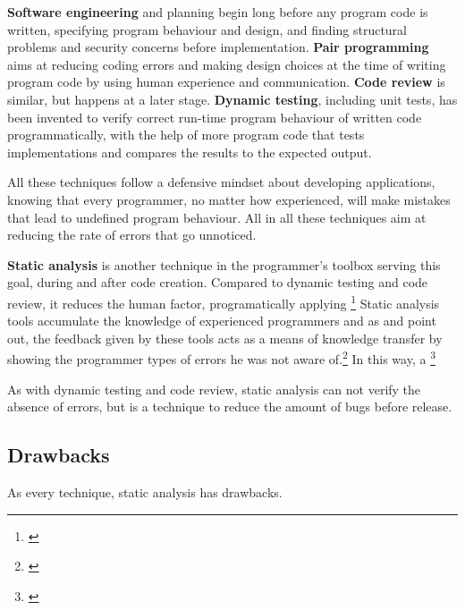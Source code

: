 \textbf{Software engineering} and planning begin long before any program code is written, specifying program behaviour and design, and finding structural problems and security concerns before implementation. \textbf{Pair programming} aims at reducing coding errors and making design choices at the time of writing program code by using human experience and communication. \textbf{Code review} is similar, but happens at a later stage. \textbf{Dynamic testing}, including unit tests, has been invented to verify correct run-time program behaviour of written code programmatically, with the help of more program code that tests implementations and compares the results to the expected output.

All these techniques follow a defensive mindset about developing applications, knowing that every programmer, no matter how experienced, will make mistakes that lead to undefined program behaviour. All in all these techniques aim at reducing the rate of errors that go unnoticed.

\textbf{Static analysis} is another technique in the programmer's toolbox serving this goal, during and after code creation. Compared to dynamic testing and code review, it reduces the human factor, programatically applying \footnote{\citep[22]{SecureProgramming}} Static analysis tools accumulate the knowledge of experienced programmers and as  and  point out, the feedback given by these tools acts as a means of knowledge transfer by showing the programmer types of errors he was not aware of.\footnote{\citep[22]{SecureProgramming}} In this way, a \footnote{\citep[13]{SecureProgramming}}

As with dynamic testing and code review, static analysis can not verify the absence of errors, but is a technique to reduce the amount of bugs before release.

\subsection{Drawbacks}

As every technique, static analysis has drawbacks. 


